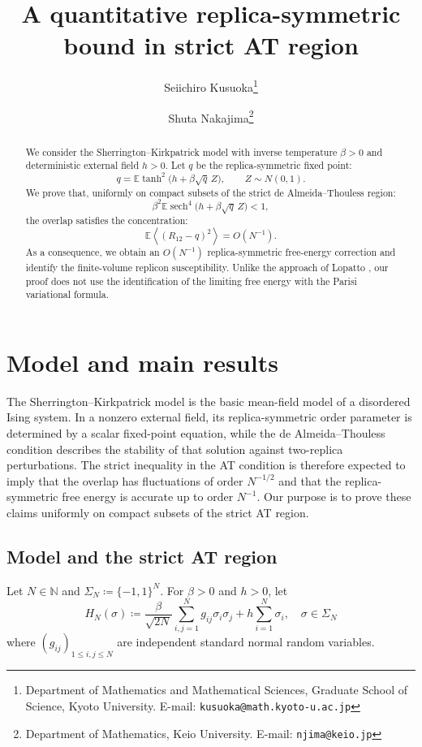 \documentclass[11pt]{article}
\title{A quantitative replica-symmetric bound in strict AT region}
\author{
  Seiichiro Kusuoka\thanks{Department of Mathematics and Mathematical Sciences, Graduate School of Science, Kyoto University. E-mail: \texttt{kusuoka@math.kyoto-u.ac.jp}}
  \and
  Shuta Nakajima\thanks{Department of Mathematics, Keio University. E-mail: \texttt{njima@keio.jp}}
}
\date{}
\numberwithin{equation}{section}
\newcommand{\E}{\mathbb{E}}
\newcommand{\1}{\mathbf 1}
\newcommand{\sech}{\operatorname{sech}}
\newcommand{\braket}[1]{\left\langle #1\right\rangle}
\begin{document}
\maketitle

\begin{abstract}
We consider the Sherrington--Kirkpatrick model with inverse temperature $\beta>0$ and deterministic external
field $h>0$.  Let $q$ be  the replica-symmetric fixed point: 
$$ q=\E\tanh^2\bigl(h+\beta\sqrt q\,Z\bigr),
 \qquad Z\sim N(0,1).$$
We prove that, uniformly on compact subsets of the strict
de Almeida--Thouless region:
$$\beta^2\E\sech^4\bigl(h+\beta\sqrt q\,Z\bigr) <1,$$ 
the overlap satisfies the concentration:
\[
 \E\braket{(R_{12}-q)^2}=O(N^{-1}).
\]
  As a consequence, we
obtain an $O(N^{-1})$ replica-symmetric free-energy correction and
identify the finite-volume replicon susceptibility.  Unlike the approach
of Lopatto \cite{Lopatto}, our proof does not use the identification of
the limiting free energy with the Parisi variational formula.
\end{abstract}

\section{Model and main results}\label{sec:intro}

The Sherrington--Kirkpatrick model is the basic mean-field model of a
disordered Ising system.  In a nonzero external field, its
replica-symmetric order parameter is determined by a scalar fixed-point
equation, while the de Almeida--Thouless condition describes the
stability of that solution against two-replica perturbations.  The
strict inequality in the AT condition is therefore expected to imply
that the overlap has fluctuations of order $N^{-1/2}$ and that the
replica-symmetric free energy is accurate up to order $N^{-1}$. Our purpose is to prove these claims
uniformly on compact subsets of the strict AT region.
\subsection{Model and the strict AT region}

Let $N \in {\mathbb N}$ and $\Sigma_N\coloneqq\{-1,1\}^N$.  For $\beta>0$ and $h>0$, let
\[
 H_N(\sigma)
 \coloneqq
 \frac{\beta}{\sqrt{2N}}\sum_{i,j=1}^Ng_{ij}\sigma_i\sigma_j
 +h\sum_{i=1}^N\sigma_i , \quad \sigma \in \Sigma _N
\]
where $(g_{ij})_{1\le i,j\le N}$ are independent standard normal random variables. 
\end{document}
